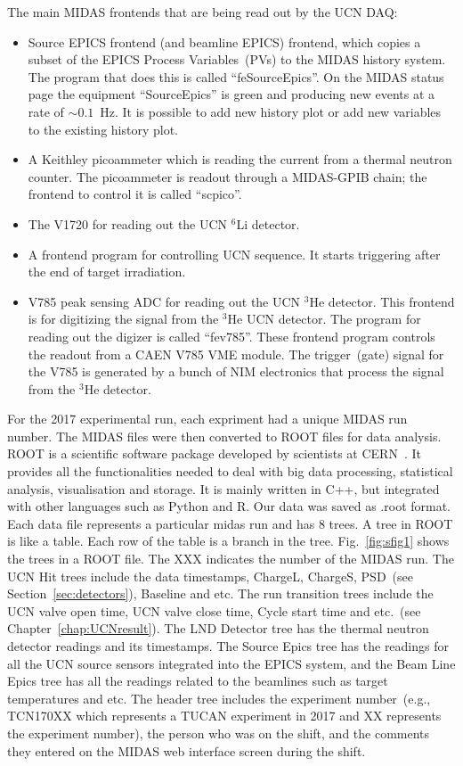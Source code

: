 The main MIDAS frontends that are being read out by the UCN DAQ:

\begin{itemize}
\item Source EPICS frontend (and beamline EPICS) frontend, which
  copies a subset of the EPICS Process Variables~(PVs) to the MIDAS
  history system.  The program that does this is called
  ``feSourceEpics''. On the MIDAS status page the equipment
  ``SourceEpics'' is green and producing new events at a rate of
  $\sim 0.1$~Hz. It is possible to add new history plot or add new
  variables to the existing history plot.
\item A Keithley picoammeter which is reading the current from a
  thermal neutron counter. The picoammeter is readout through a
  MIDAS-GPIB chain; the frontend to control it is called ``scpico''.
\item The V1720 for reading out the UCN $^6$Li detector.
\item A frontend program for controlling UCN sequence. It starts
  triggering after the end of target irradiation.
\item V785 peak sensing ADC for reading out the UCN $^3$He detector.
  This frontend is for digitizing the signal from the $^3$He UCN
  detector.  The program for reading out the digizer is called
  ``fev785''.  These frontend program controls the readout from a CAEN
  V785 VME module. The trigger~(gate) signal for the V785 is generated
  by a bunch of NIM electronics that process the signal from the
  $^3$He detector.
\end{itemize}

For the 2017 experimental run, each expriment had a unique MIDAS run
number. The MIDAS files were then converted to ROOT files for data
analysis. ROOT is a scientific software package developed by
scientists at CERN~\cite{brun1997root}. It provides all the
functionalities needed to deal with big data processing, statistical
analysis, visualisation and storage. It is mainly written in C++, but
integrated with other languages such as Python and R. Our data was
saved as .root format. Each data file represents a particular midas
run and has 8 trees. A tree in ROOT is like a table. Each row of the
table is a branch in the tree. Fig.~\ref{fig:sfig1} shows the trees in
a ROOT file. The XXX indicates the number of the MIDAS run. The UCN
Hit trees include the data timestamps, ChargeL, ChargeS, PSD~(see
Section~\ref{sec:detectors}), Baseline and etc. The run transition
trees include the UCN valve open time, UCN valve close time, Cycle
start time and etc.~(see Chapter~\ref{chap:UCNresult}). The LND
Detector tree has the thermal neutron detector readings and its
timestamps. The Source Epics tree has the readings for all the UCN
source sensors integrated into the EPICS system, and the Beam Line
Epics tree has all the readings related to the beamlines such as
target temperatures and etc. The header tree includes the experiment
number~(e.g., TCN170XX which represents a TUCAN experiment in 2017 and
XX represents the experiment number), the person who was on the shift,
and the comments they entered on the MIDAS web interface screen during
the shift.

